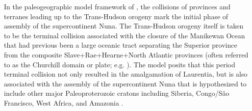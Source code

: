 \documentclass[11pt,letterpaper]{article}
\begin{document}
In the paleogeographic model framework of \cite{Pehrsson2015a}, the collisions of provinces and terranes leading up to the Trans-Hudson orogeny mark the initial phase of assembly of the supercontinent Nuna. The Trans-Hudson orogeny itself is taken to be the terminal collision associated with the closure of the Manikewan Ocean that had previous been a large oceanic tract separating the Superior province from the composite Slave+Rae+Hearne+North Atlantic provinces (often referred to as the Churchill domain or plate; e.g. \citealp{Skipton2016a, Weller2017a}). The \cite{Pehrsson2015a} model posits that this period terminal collision not only resulted in the amalgamation of Laurentia, but is also associated with the assembly of the supercontinent Nuna that is hypothesized to include other major Paleoproterozoic cratons including Siberia, Congo/S\~ao Francisco, West Africa, and Amazonia \citep{Whitmeyer2007a, Pehrsson2015a}. 
\end{document}
